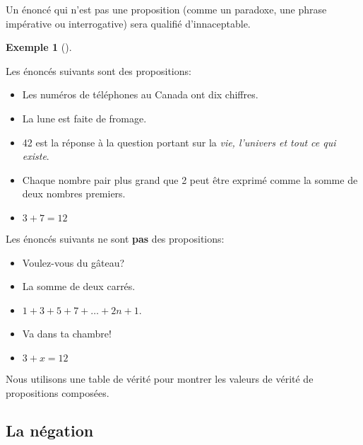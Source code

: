 \documentclass[
  letterpaper,
]{scrbook}
\providecommand{\tightlist}{%
  \setlength{\itemsep}{0pt}\setlength{\parskip}{0pt}}\usepackage{longtable,booktabs,array}
\theoremstyle{definition}
\theoremstyle{definition}
\newtheorem{example}{Exemple}[chapter]
\theoremstyle{remark}
\begin{document}
Un énoncé qui n'est pas une proposition (comme un paradoxe, une phrase
impérative ou interrogative) sera qualifié d'innaceptable.

\leavevmode{}%
\begin{example}[]\label{exm-propositions}

Les énoncés suivants sont des propositions:

\begin{itemize}
\tightlist
\item
  Les numéros de téléphones au Canada ont dix chiffres.
\item
  La lune est faite de fromage.
\item
  42 est la réponse à la question portant sur la \emph{vie, l'univers et
  tout ce qui existe}.
\item
  Chaque nombre pair plus grand que 2 peut être exprimé comme la somme
  de deux nombres premiers.
\item
  \(3+7=12\)
\end{itemize}

Les énoncés suivants ne sont \textbf{pas} des propositions:

\begin{itemize}
\tightlist
\item
  Voulez-vous du gâteau?
\item
  La somme de deux carrés.
\item
  \(1+3+5+7+\ldots +2n+1\).
\item
  Va dans ta chambre!
\item
  \(3+x=12\)
\end{itemize}

\end{example}

Nous utilisons une table de vérité pour montrer les valeurs de vérité de
propositions composées.

\hypertarget{la-nuxe9gation}{%
\subsection{La négation}\label{la-nuxe9gation}}
\end{document}
